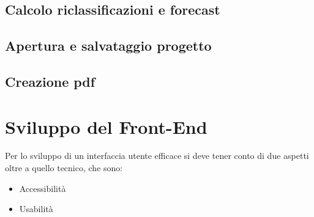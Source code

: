\subsection {Calcolo riclassificazioni e forecast}


\subsection {Apertura e salvataggio progetto}


\subsection {Creazione pdf}



\newpage

\section{Sviluppo del Front-End}

Per lo sviluppo di un interfaccia utente efficace si deve tener conto di due aspetti oltre a quello tecnico, che sono:
\begin{itemize}
\item Accessibilità
\item Usabilità
\end{itemize}

